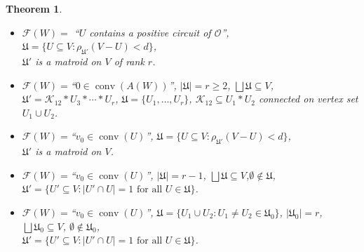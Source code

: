 \documentclass[a4paper,11pt,reqno, english]{amsart}
\newtheorem{theorem}{Theorem}[section]
\theoremstyle{definition}
\theoremstyle{remark}
\DeclareMathOperator{\conv}{\mathrm{conv}}
\begin{document}
\begin{theorem}
\begin{itemize}
        \item[\ref{thm:caratheodory:oriented-matroid}.]
        $\mathcal{F}(W)=$ ``$U$ contains a positive circuit of $\mathscr{O}$'', $\mathfrak{U}=\{U\subseteq V:\rho_{\mathfrak{U}'}(V-U)<d\}$, \\
        $\mathfrak{U}'$ is a matroid on $V$ of rank $r$.

        \item[\ref{thm:caratheodory:constrained}.]
        $\mathcal{F}(W)=$``$0\in\conv(A(W))$'', $|\mathfrak{U}|=r\geq 2$, $\bigsqcup\mathfrak{U}\subseteq V$, \\
        $\mathfrak{U}'=\mathscr{K}_{12}*U_3*\cdots*U_r$, $\mathfrak{U}=\{U_1,\ldots,U_r\}$, $\mathscr{K}_{12}\subseteq U_1*U_2$ connected on vertex set $U_1\cup U_2$.

        \item[\ref{thm:caratheodory:om-cone-matroid}.]
        $\mathcal{F}(W)=$``$v_0\in\conv(U)$'', $\mathfrak{U}=\{U\subseteq V:\rho_{\mathfrak{U}'}(V-U)< d\}$, \\
        $\mathfrak{U}'$ is a matroid on $V$.
        
        \item[\ref{thm:caratheodory:om-cone}.]
        $\mathcal{F}(W)=$``$v_0\in\conv(U)$'', $|\mathfrak{U}|=r-1$, $\bigsqcup\mathfrak{U}\subseteq V$,$\emptyset\notin\mathfrak{U}$, \\
        $\mathfrak{U}'=\{U'\subseteq V:|U'\cap U|=1\text{~for all~}U\in\mathfrak{U}\}$.

        \item[\ref{thm:caratheodory:om-cone-pair}.]
        $\mathcal{F}(W)=$``$v_0\in\conv(U)$'', $\mathfrak{U}=\{U_1\cup U_2:U_1\neq U_2\in\mathfrak{U}_0\}$, $|\mathfrak{U}_0|=r$, $\bigsqcup\mathfrak{U}_0\subseteq V$, $\emptyset\notin\mathfrak{U}_0$, \\
        $\mathfrak{U}'=\{U'\subseteq V:|U'\cap U|=1\text{~for all~}U\in\mathfrak{U}\}$.
    \end{itemize}
\end{theorem}
\end{document}
